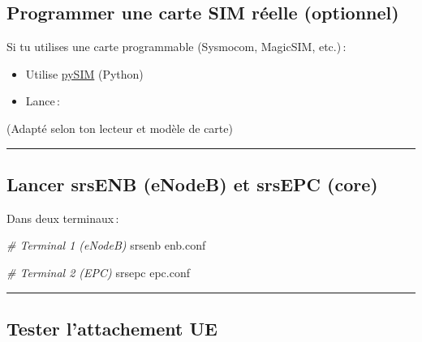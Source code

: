 \documentclass[
  french,
]{article}
\newenvironment{Shaded}{\begin{snugshade}}{\end{snugshade}}
\newcommand{\AttributeTok}[1]{\textcolor[rgb]{0.13,0.29,0.53}{#1}}
\newcommand{\CommentTok}[1]{\textcolor[rgb]{0.56,0.35,0.01}{\textit{#1}}}
\newcommand{\ExtensionTok}[1]{#1}
\newcommand{\NormalTok}[1]{#1}
\newcommand{\VariableTok}[1]{\textcolor[rgb]{0.00,0.00,0.00}{#1}}
\providecommand{\tightlist}{%
  \setlength{\itemsep}{0pt}\setlength{\parskip}{0pt}}
\begin{document}
\subsection{Programmer une carte SIM réelle
(optionnel)}\label{programmer-une-carte-sim-ruxe9elle-optionnel}

Si tu utilises une carte programmable (Sysmocom, MagicSIM, etc.)\,:

\begin{itemize}
\tightlist
\item
  Utilise \href{https://github.com/osmocom/pysim}{pySIM} (Python)
\item
  Lance\,:
\end{itemize}

\begin{Shaded}
\end{Shaded}

(Adapté selon ton lecteur et modèle de carte)

\begin{center}\rule{0.5\linewidth}{0.5pt}\end{center}

\subsection{Lancer srsENB (eNodeB) et srsEPC
(core)}\label{lancer-srsenb-enodeb-et-srsepc-core}

Dans deux terminaux\,:

\begin{Shaded}
\begin{Highlighting}[]
\CommentTok{\# Terminal 1 (eNodeB)}
\ExtensionTok{srsenb}\NormalTok{ enb.conf}

\CommentTok{\# Terminal 2 (EPC)}
\ExtensionTok{srsepc}\NormalTok{ epc.conf}
\end{Highlighting}
\end{Shaded}

\begin{center}\rule{0.5\linewidth}{0.5pt}\end{center}

\subsection{Tester l'attachement UE}\label{tester-lattachement-ue}
\end{document}
